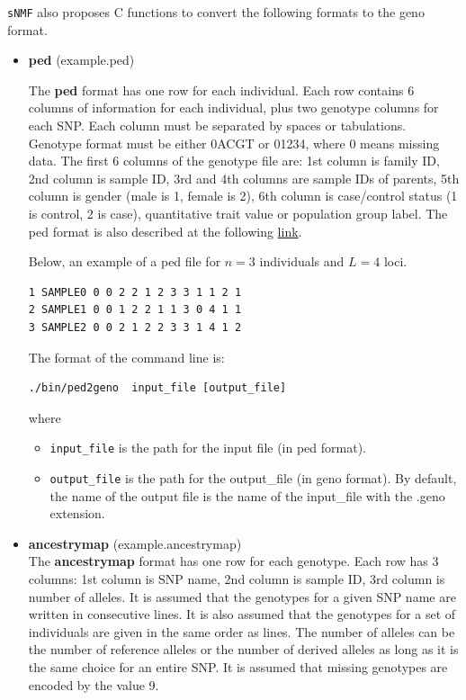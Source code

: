 \documentclass[10pt,a4paper]{article}
\begin{document}
\noindent
{\tt sNMF} also proposes C functions to convert the following formats to the geno format.
\begin{itemize}
\item {\bf ped} (example.ped)

The {\bf ped} format has one row for each individual. Each row contains 6 columns of information for each individual, plus two genotype columns for each SNP. Each column must be separated by spaces or tabulations. Genotype format must be either 0ACGT or 01234, where 0 means missing data. The first 6 columns of the genotype file are: 1st column is family ID, 2nd column is sample ID, 3rd and 4th columns are sample IDs of parents, 5th column is gender (male is 1, female is 2), 6th column is case/control status (1 is control, 2 is case), quantitative trait value or population group label. 
The ped format is also described at the following \href{http://pngu.mgh.harvard.edu/~purcell/plink/data.shtml#ped}{link}.

Below, an example of a ped file for $n=3$ individuals and $L=4$ loci.
\begin{center}
\footnotesize
\begin{Verbatim}[frame=single]
1 SAMPLE0 0 0 2 2 1 2 3 3 1 1 2 1
2 SAMPLE1 0 0 1 2 2 1 1 3 0 4 1 1
3 SAMPLE2 0 0 2 1 2 2 3 3 1 4 1 2
\end{Verbatim}
\end{center}

The format of the command line is:
\begin{Verbatim}[frame=single]
./bin/ped2geno  input_file [output_file]
\end{Verbatim}
where 
\begin{itemize}
\item \verb|input_file| is the path for the input file (in ped format).
\item \verb|output_file| is the path for the output\_file (in geno format). 
By default, the name of the output file is the name of the input\_file with the .geno extension.

\end{itemize}

\item {\bf ancestrymap} (example.ancestrymap)\\
The {\bf ancestrymap} format has one row for each genotype. Each row has 3 columns: 1st column is SNP name, 2nd column is sample ID, 3rd column is number of alleles. It is assumed that the genotypes for a given SNP name are written in consecutive lines. It is also assumed that the genotypes for a set of individuals are given in the same order as lines. The number of alleles can be the number of reference alleles or the number of derived alleles as long as it is the same choice for an entire SNP. It is assumed that missing genotypes are encoded by the value 9.


\end{itemize}
\end{document}
